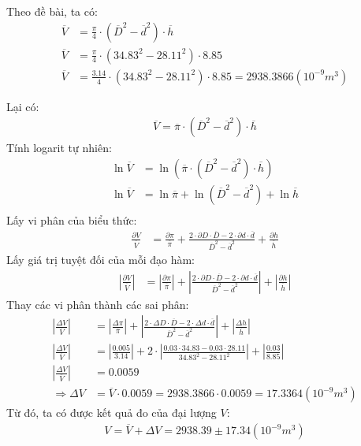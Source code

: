 \documentclass{article}
\begin{document}
Theo đề bài, ta có: 
\begin{align*}
    \overline{V} &= \frac{\pi}{4}\cdot(\overline{D}^2 - \overline{d}^2)\cdot\overline{h}\\
    \overline{V} &= \frac{\pi}{4}\cdot(34.83^2 - 28.11^2)\cdot 8.85\\
    \overline{V} &= \frac{3.14}{4}\cdot(34.83^2 - 28.11^2)\cdot 8.85 = 2938.3866(10^{-9} m^3)
\end{align*}

Lại có:
\begin{align*}
    \overline{V} = \overline{\pi}\cdot(\overline{D}^2 - \overline{d}^2)\cdot\overline{h}
\end{align*}
Tính logarit tự nhiên:
\begin{align*}
    \ln \overline{V} &= \ln(\overline{\pi}\cdot(\overline{D}^2 - \overline{d}^2)\cdot\overline{h})\\
    \ln \overline{V} &= \ln\overline{\pi} + \ln(\overline{D}^2 - \overline{d}^2) + \ln\overline{h}\\
\end{align*}
Lấy vi phân của biểu thức:
\begin{align*}
    \frac{\partial V}{\overline{V}} &= \frac{\partial\pi}{\overline{\pi}} + \frac{2\cdot\partial D\cdot \overline{D} - 2\cdot\partial d\cdot \overline{d}}{\overline{D}^2 - \overline{d}^2} + \frac{\partial h}{\overline{h}}
\end{align*}
Lấy giá trị tuyệt đối của mỗi đạo hàm:
\begin{align*}
    \left|\frac{\partial V}{\overline{V}}\right| &= \left|\frac{\partial\pi}{\overline{\pi}}\right| + \left|\frac{2\cdot\partial D\cdot \overline{D} - 2\cdot\partial d\cdot \overline{d}}{\overline{D}^2 - \overline{d}^2}\right| + \left|\frac{\partial h}{\overline{h}}\right|
\end{align*}
Thay các vi phân thành các sai phân:
\begin{align*}
    \left|\frac{\Delta V}{\overline{V}}\right| &= \left|\frac{\Delta\pi}{\overline{\pi}}\right| + \left|\frac{2\cdot\Delta D\cdot \overline{D} - 2\cdot\Delta d\cdot \overline{d}}{\overline{D}^2 - \overline{d}^2}\right| + \left|\frac{\Delta h}{\overline{h}}\right|\\
    \left|\frac{\Delta V}{\overline{V}}\right| &= \left|\frac{0.005}{3.14}\right| + 2\cdot\left|\frac{0.03\cdot 34.83 - 0.03\cdot 28.11}{34.83^2 - 28.11^2}\right| + \left|\frac{0.03}{8.85}\right|\\
    \left|\frac{\Delta V}{\overline{V}}\right| &= 0.0059 \\
    \Rightarrow \Delta V &= \overline{V}\cdot 0.0059 = 2938.3866 \cdot 0.0059 = 17.3364 (10^{-9}m^3)
\end{align*}
Từ đó, ta có được kết quả đo của đại lượng $V$:
\begin{align*}
    V = \overline{V} + \Delta V = 2938.39 \pm 17.34 (10^{-9} m^3)
\end{align*}
\end{document}
